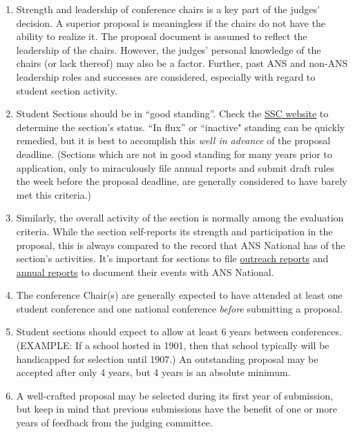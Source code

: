 \documentclass[12pt]{article}
\begin{document}
\begin{enumerate}
\item{Strength and leadership of conference chairs is a key part of the judges’ decision.
A superior proposal is meaningless if the chairs do not have the ability to realize
it. The proposal document is assumed to reflect the leadership of the chairs.
However, the judges’ personal knowledge of the chairs (or lack thereof) may also
be a factor. Further, past ANS and non-ANS leadership roles and successes are
considered, especially with regard to student section activity.}
\item{Student Sections should be in “good standing”. Check the \href{http://students.ans.org/section-standing/}{SSC website} to
determine the section’s status. ``In flux” or ``inactive" standing can be quickly remedied, but it is best to accomplish this \emph{well in advance} of the proposal deadline.
(Sections which are not in good standing for many years prior to application, only to
miraculously file annual reports and submit draft rules the week before the
proposal deadline, are generally considered to have barely met this criteria.)}
\item{Similarly, the overall activity of the section is normally among the evaluation
criteria. While the section self-reports its strength and participation in the proposal, this is always compared to the record that ANS National has of the section’s activities. It’s important for sections to file \href{http://students.ans.org/outreach/}{outreach reports} and \href{http://students.ans.org/section-standing/}{annual reports} to document their events with ANS National.}
\item{The conference Chair(s) are generally expected to have attended at least one
student conference and one national conference \textit{before} submitting a proposal.}
\item{Student sections should expect to allow at least 6 years between conferences.
(EXAMPLE: If a school hosted in 1901, then that school typically will be
handicapped for selection until 1907.) An outstanding proposal may be accepted
after only 4 years, but 4 years is an absolute minimum.}
\item{A well-crafted proposal may be selected during its first year of submission, but keep in mind that previous submissions have the benefit of one or more years of feedback from the judging committee.}

\end{enumerate}

\newpage
\end{document}
